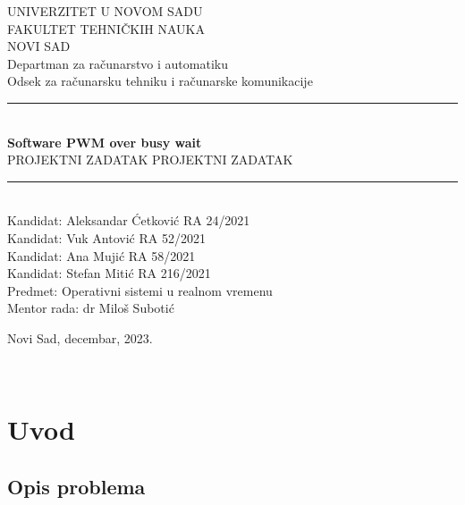 \documentclass[a4paper, 11pt, titlepage]{article}
\title{\reporttitle}
\date{\today}
\def\departman{Departman za računarstvo i automatiku}
\def\odsek{Odsek za računarsku tehniku i računarske komunikacije}
\def\reporttitle{Software PWM over busy wait}
\def\institutionname{UNIVERZITET U NOVOM SADU}
\def\institutionnames{FAKULTET TEHNIČKIH NAUKA}
\def\cityname{NOVI SAD}
\def\authornameA{Kandidat: Aleksandar Ćetković RA 24/2021}
\def\authornameB{Kandidat: Vuk Antović RA 52/2021}
\def\authornameC{Kandidat: Ana Mujić RA 58/2021}
\def\authornameD{Kandidat: Stefan Mitić RA 216/2021}
\def\predmet{Predmet: Operativni sistemi u realnom vremenu}
\def\mentor{Mentor rada: dr Miloš Subotić}
\def\reportsubtitle{PROJEKTNI ZADATAK}
\begin{document}
\begin{titlepage} 
\newcommand{\HRule}{\rule{\linewidth}{0.5mm}}

\center
\textsc{\Large \institutionname}\\[0.2cm]
\textsc{\Large \institutionnames}\\[0.2cm]
\textsc{\Large \cityname}\\[0.2cm]
\textmd{\Large \departman}\\[0.1cm] 
\textmd{\Large \odsek}\\[0.1cm] 


\HRule\\[0.8cm]

{\huge\bfseries \reporttitle}\\[0.4cm]
\ifx\reportsubtitle\undefined 
\else
    {\textsc{\Large \reportsubtitle}}\\[0.4cm] 
\fi

\HRule\\[1.5cm]


\authornameA \\[0.5cm]
\authornameB \\[0.5cm]
\authornameC \\[0.5cm]
\authornameD \\[0.5cm]
\predmet\\[0.5cm]
\mentor \\[0.5cm]

\vfill\vfill\vfill\vfill\vfill\vfill\vfill\vfill\vfill\vfill\vfill\vfill\vfill\vfill\vfill\vfill\vfill\vfill\vfill\vfill\vfill

{\large Novi Sad, decembar, 2023.}

 
\end{titlepage}
{\hypersetup{linkcolor=black} 
\thispagestyle{empty}
\newpage
\thispagestyle{empty}
\tableofcontents
\newpage
\
}



\section{Uvod}

\subsection{Opis problema}
\end{document}
